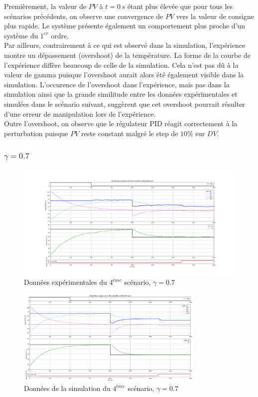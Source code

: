 Premièrement, la valeur de $PV$ à $t = 0\,s$ étant plus élevée que pour tous les scénarios précédents, on observe une convergence de $PV$ vers la valeur de consigne 
plus rapide. Le système présente également un comportement plus proche d'un système du $1^{er}$ ordre. 
\\Par ailleurs, contrairement à ce qui est observé dans la simulation, l'expérience montre un dépassement (overshoot) de la température.
La forme de la courbe de l'expérience diffère beaucoup de celle de la simulation. Cela n'est pas dû à la valeur de gamma puisque l'overshoot aurait alors été également visible dans la simulation. 
L'occurence de l'overshoot dans l'expérience, mais pas dans la simulation ainsi que la grande similitude entre les données expérimentales et simulées dans le 
scénario suivant, suggèrent que cet overshoot pourrait résulter d'une erreur de manipulation lors de l'expérience.
\\Outre l'overshoot, on observe que le régulateur PID réagit correctement à la perturbation puisque $PV$ reste constant malgré le step de $10\%$ sur $DV$.

\subsubsection{$\gamma = 0.7$}

\begin{figure}[H]
	\centering
	\includegraphics[width=1\textwidth]{../Plots/Experiment_scenario_7_2024-03-29-22h23.png}
	\caption{Données expérimentales du $4^{ème}$ scénario, $\gamma = 0.7$}
	\label{fig:exp_scenario5_0.7}
\end{figure}
\begin{figure}[H]
	\centering
	\includegraphics[width=0.8\textwidth]{figures/scenario77.png}
	\caption{Données de la simulation du $4^{ème}$ scénario, $\gamma = 0.7$}
	\label{fig:sim_scenario5_0.7}
\end{figure}

